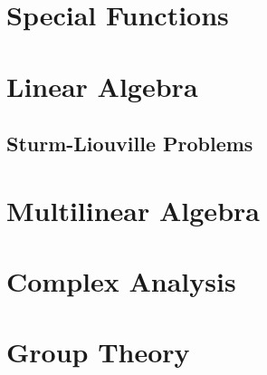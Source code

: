 \documentclass{momento}
\begin{document}


\chapter{Special Functions}
\label{cha:special-functions}



\chapter{Linear Algebra}
\label{cha:linear-algebra}



\section{Sturm-Liouville Problems}
\label{sec:sturm-liouv-probl}



\chapter{Multilinear Algebra}
\label{cha:multilinear-algebra}



\chapter{Complex Analysis}
\label{cha:complex-analysis}



\chapter{Group Theory}
\label{cha:group-theory}


\end{document}
